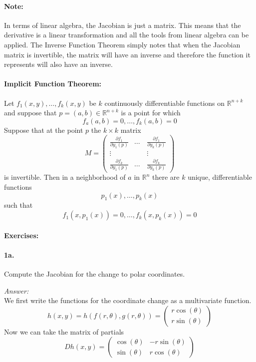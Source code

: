 \documentclass[10pt,a4paper]{article}
\begin{document}
\paragraph{Note:} In terms of linear algebra, the Jacobian is just a matrix. This means that the derivative is a linear transformation and all the tools from linear algebra can be applied. The Inverse Function Theorem simply notes that when the Jacobian matrix is invertible, the matrix will have an inverse and therefore the function it represents will also have an inverse.

\paragraph{Implicit Function Theorem:} Let $f_1(x,y), \dots, f_k(x,y)$ be $k$ continuously differentiable functions on $\mathbb{R}^{n+k}$ and suppose that $p = (a,b) \in \mathbb{R}^{n+k}$ is a point for which
$$ f_a(a,b) = 0, \dots, f_k(a,b) = 0$$
Suppose that at the point $p$ the $k \times k$ matrix
$$ M = 
\begin{pmatrix}
\frac{\partial f_1}{\partial y_1(p)} & \dots & \frac{\partial f_1}{\partial y_k(p)}\\
\vdots & \quad & \vdots\\
\frac{\partial f_k}{\partial y_1(p)} & \dots & \frac{\partial f_k}{\partial y_k(p)}
\end{pmatrix}$$
is invertible. Then in a neighborhood of $a$ in $\mathbb{R}^n$ there are $k$ unique, differentiable functions
$$p_1(x), \dots, p_k(x)$$
such that
$$ f_1(x,p_1(x))=0, \dots, f_k(x,p_k(x)) = 0$$

\paragraph{Exercises:}

\paragraph{1a.} Compute the Jacobian for the change to polar coordinates.
\begin{flushleft}
\textit{Answer:}\\
We first write the functions for the coordinate change as a multivariate function.
$$ h(x,y) = h(f(r,\theta), g(r,\theta)) = 
\begin{pmatrix}
r\cos(\theta)\\
r\sin(\theta)
\end{pmatrix}$$
Now we can take the matrix of partials
$$ Dh(x,y) = 
\begin{pmatrix}
\cos(\theta) & -r\sin(\theta)\\
\sin(\theta) & r\cos(\theta)
\end{pmatrix} $$
\end{flushleft}
\end{document}
